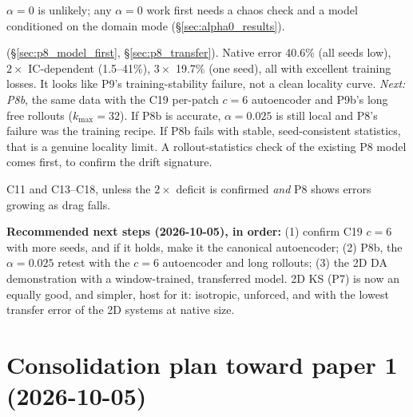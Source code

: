 \documentclass[11pt]{article}
\begin{document}
\begin{description}[leftmargin=*]
  $\alpha{=}0$ is unlikely; any $\alpha{=}0$ work first needs a chaos
  check and a model conditioned on the domain mode
  (\S\ref{sec:alpha0_results}).
\item[P8 ($\alpha{=}0.025$): FAILED with the P2 recipe, cause not
  yet separated] (\S\ref{sec:p8_model_first}, \S\ref{sec:p8_transfer}).
  Native error 40.6\% (all seeds low), $2\times$ IC-dependent (1.5--41\%),
  $3\times$ 19.7\% (one seed), all with excellent training losses. It looks
  like P9's training-stability failure, not a clean locality curve.
  \emph{Next: P8b}, the same data with the C19 per-patch $c{=}6$
  autoencoder and P9b's long free rollouts ($k_{\max}{=}32$). If P8b is
  accurate, $\alpha{=}0.025$ is still local and P8's failure was the
  training recipe. If P8b fails with stable, seed-consistent statistics,
  that is a genuine locality limit. A rollout-statistics check of the
  existing P8 model comes first, to confirm the drift signature.
\item[Deprioritized.] C11 and C13--C18, unless the $2\times$ deficit is
  confirmed \emph{and} P8 shows errors growing as drag falls.
\end{description}

\textbf{Recommended next steps (2026-10-05), in order:} (1) confirm
C19 $c{=}6$ with more seeds, and if it holds, make it the canonical
autoencoder; (2) P8b, the $\alpha{=}0.025$ retest with the $c{=}6$
autoencoder and long rollouts; (3) the 2D DA demonstration with a
window-trained, transferred model. 2D KS (P7) is
now an equally good, and simpler, host for it: isotropic, unforced, and
with the lowest transfer error of the 2D systems at native size.

\section{Consolidation plan toward paper 1 (2026-10-05)}
\label{sec:consolidation}
\end{document}
